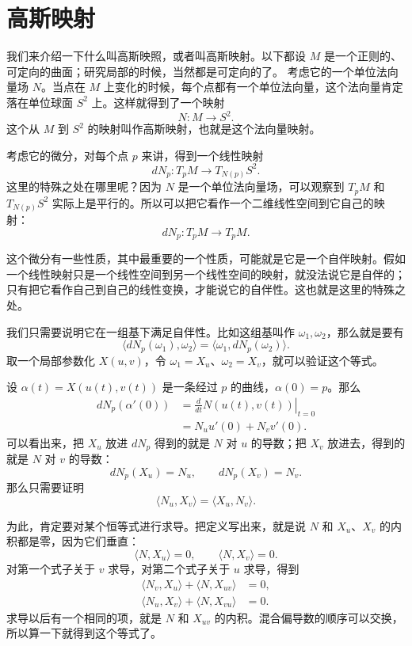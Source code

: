 \documentclass[UTF8,11pt,a4paper]{ctexart}
\newcommand{\ip}[2]{\langle #1,#2\rangle}
\begin{document}
\section{高斯映射}

我们来介绍一下什么叫高斯映照，或者叫高斯映射。以下都设 $M$ 是一个正则的、可定向的曲面；研究局部的时候，当然都是可定向的了。
考虑它的一个单位法向量场 $N$。当点在 $M$ 上变化的时候，每个点都有一个单位法向量，这个法向量肯定落在单位球面 $S^2$ 上。这样就得到了一个映射
\[
N\colon M\longrightarrow S^2.
\]
这个从 $M$ 到 $S^2$ 的映射叫作高斯映射，也就是这个法向量映射。

考虑它的微分，对每个点 $p$ 来讲，得到一个线性映射
\[
dN_p\colon T_pM\longrightarrow T_{N(p)}S^2.
\]
这里的特殊之处在哪里呢？因为 $N$ 是一个单位法向量场，可以观察到 $T_pM$ 和 $T_{N(p)}S^2$ 实际上是平行的。所以可以把它看作一个二维线性空间到它自己的映射：
\[
dN_p\colon T_pM\longrightarrow T_pM.
\]

这个微分有一些性质，其中最重要的一个性质，可能就是它是一个自伴映射。假如一个线性映射只是一个线性空间到另一个线性空间的映射，就没法说它是自伴的；只有把它看作自己到自己的线性变换，才能说它的自伴性。这也就是这里的特殊之处。

我们只需要说明它在一组基下满足自伴性。比如这组基叫作 $\omega_1,\omega_2$，那么就是要有
\[
\ip{dN_p(\omega_1)}{\omega_2}
=\ip{\omega_1}{dN_p(\omega_2)}.
\]
取一个局部参数化 $X(u,v)$，令 $\omega_1=X_u$、$\omega_2=X_v$，就可以验证这个等式。

设 $\alpha(t)=X(u(t),v(t))$ 是一条经过 $p$ 的曲线，$\alpha(0)=p$。那么
\[
\begin{aligned}
dN_p(\alpha'(0))
&=\left.\frac{d}{dt}N(u(t),v(t))\right|_{t=0}\\
&=N_u u'(0)+N_v v'(0).
\end{aligned}
\]
可以看出来，把 $X_u$ 放进 $dN_p$ 得到的就是 $N$ 对 $u$ 的导数；把 $X_v$ 放进去，得到的就是 $N$ 对 $v$ 的导数：
\[
dN_p(X_u)=N_u,\qquad dN_p(X_v)=N_v.
\]
那么只需要证明
\[
\ip{N_u}{X_v}=\ip{X_u}{N_v}.
\]

为此，肯定要对某个恒等式进行求导。把定义写出来，就是说 $N$ 和 $X_u$、$X_v$ 的内积都是零，因为它们垂直：
\[
\ip{N}{X_u}=0,\qquad \ip{N}{X_v}=0.
\]
对第一个式子关于 $v$ 求导，对第二个式子关于 $u$ 求导，得到
\[
\begin{aligned}
\ip{N_v}{X_u}+\ip{N}{X_{uv}}&=0,\\
\ip{N_u}{X_v}+\ip{N}{X_{vu}}&=0.
\end{aligned}
\]
求导以后有一个相同的项，就是 $N$ 和 $X_{uv}$ 的内积。混合偏导数的顺序可以交换，所以算一下就得到这个等式了。
\end{document}
